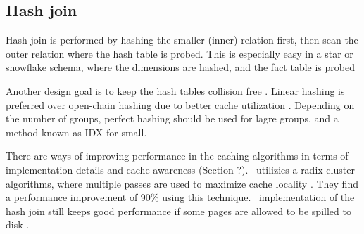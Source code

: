 \subsection{Hash join}
\label{sub:Hash join}
Hash join is performed by hashing the smaller (inner) relation first, then scan the outer relation where the hash table is probed. This is especially easy in a star or snowflake schema, where the dimensions are hashed, and the fact table is probed \cite{Barber2012-xt, Raman2013-em}

Another design goal is to keep the hash tables collision free \cite{Raman2013-em, Raman2008-gi}. Linear hashing is preferred over open-chain hashing due to better cache utilization \cite{Raman2008-gi}. Depending on the number of groups, perfect hashing should be used for lagre groups, and a method known as IDX for small.

There are ways of improving performance in the caching algorithms in terms of implementation details and cache awareness (Section ?). \monetdb~utilizies a radix cluster algorithms, where multiple passes are used to maximize cache locality \cite{Boncz2002-yj}. They find a performance improvement of 90\% using this technique. \mssql~implementation of the hash join still keeps good performance if some pages are allowed to be spilled to disk \cite{Larson2013-mc}. 

